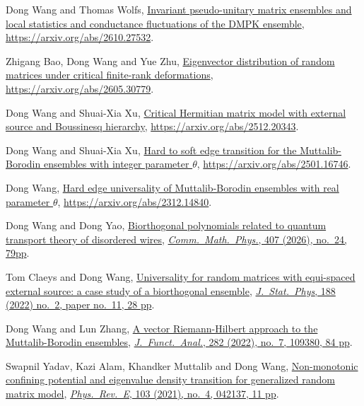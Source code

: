 \documentclass[12pt, a4paper]{article}
\begin{document}
\begin{etaremune}
\item
  Dong Wang and Thomas Wolfs, \href{https://arxiv.org/abs/2610.27532}{Invariant pseudo-unitary matrix ensembles and local statistics and conductance fluctuations of the DMPK ensemble}, \url{https://arxiv.org/abs/2610.27532}.
\item
  Zhigang Bao, Dong Wang and Yue Zhu, \href{https://arxiv.org/abs/2605.30779}{Eigenvector distribution of random matrices under critical finite-rank deformations}, \url{https://arxiv.org/abs/2605.30779}.
\item
  Dong Wang and Shuai-Xia Xu, \href{https://arxiv.org/abs/2512.20343}{Critical Hermitian matrix model with external source and Boussinesq hierarchy}, \url{https://arxiv.org/abs/2512.20343}.
\item
  Dong Wang and Shuai-Xia Xu, \href{https://arxiv.org/abs/2501.16746}{Hard to soft edge transition for the Muttalib-Borodin ensembles with integer parameter $\theta$}, \url{https://arxiv.org/abs/2501.16746}.
\item
  Dong Wang, \href{https://arxiv.org/abs/2312.14840}{Hard edge universality of Muttalib-Borodin ensembles with real parameter $\theta$}, \url{https://arxiv.org/abs/2312.14840}.
\item
  Dong Wang and Dong Yao, \href{https://arxiv.org/abs/2307.03720}{Biorthogonal polynomials related to quantum transport theory of disordered wires}, \href{https://doi.org/10.1007/s00220-025-05524-x}{\textit{Comm.\ Math.\ Phys.}, 407 (2026), no.\ 24, 79pp}.
\item
  Tom Claeys and Dong Wang, \href{https://arxiv.org/abs/2202.03827}{Universality for random matrices with equi-spaced external source: a case study of a biorthogonal ensemble}, \href{https://doi.org/10.1007/s10955-022-02937-z}{\textit{J.\ Stat.\ Phys}, 188 (2022) no.\ 2, paper no.\ 11, 28 pp}.
\item
  Dong Wang and Lun Zhang, \href{https://arxiv.org/abs/2103.10327}{A vector Riemann-Hilbert approach to the Muttalib-Borodin ensembles}, \href{https://doi.org/10.1016/j.jfa.2021.109380}{\textit{J.\ Funct.\ Anal.}, 282 (2022), no.\ 7, 109380, 84 pp}.
\item
  Swapnil Yadav, Kazi Alam, Khandker Muttalib and Dong Wang, \href{https://arxiv.org/abs/2010.08856}{Non-monotonic confining potential and eigenvalue density transition for generalized random matrix model}, \href{https://doi.org/10.1103/PhysRevE.103.042137}{\textit{Phys.\ Rev.\ E}, 103 (2021), no.\ 4, 042137, 11 pp}.
\item

\end{etaremune}
\end{document}
